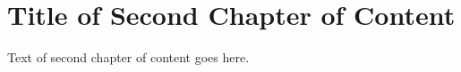 \chapter{Title of Second Chapter of Content}
\label{chap:two}

Text of second chapter of content goes here.
